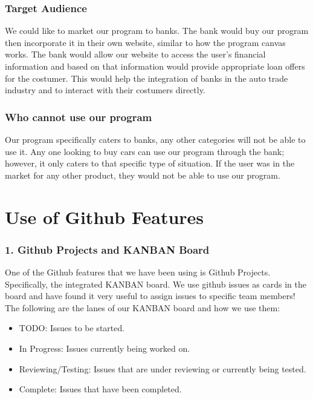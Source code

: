 \documentclass[fontsize=14pt]{article}
\begin{document}
\subsubsection*{Target Audience}

We could like to market our program to banks. The bank would buy our program then incorporate it in their own website, similar to how the program canvas works. The bank would allow our website to access the user's financial information and based on that information would provide appropriate loan offers for the costumer. This would help the integration of banks in the auto trade industry and to interact with their costumers directly.

\subsubsection*{Who cannot use our program}
Our program specifically caters to banks, any other categories will not be able to use it. Any one looking to buy cars can use our program through the bank; however, it only caters to that specific type of situation. If the user was in the market for any other product, they would not be able to use our program. 

\section*{Use of Github Features}

\subsubsection*{1. Github Projects and KANBAN Board}

One of the Github features that we have been using is Github Projects. Specifically, the integrated KANBAN board. We use github issues as cards in the board and have found it very useful to assign issues to specific team members! The following are the lanes of our KANBAN board and how we use them:

\bigskip
\bigskip

\begin{itemize}
    \item TODO: Issues to be started.
    \item In Progress: Issues currently being worked on.
    \item Reviewing/Testing: Issues that are under reviewing or currently being tested.
    \item Complete: Issues that have been completed.
\end{itemize}
\end{document}
